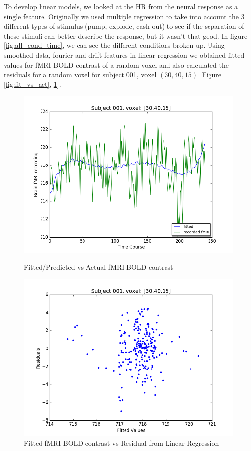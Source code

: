 \par To develop linear models, we looked at the HR from the neural response 
as a single feature. Originally we used multiple regression to take into 
account the 3 different types of stimulus (pump, explode, cash-out) to see if 
the separation of these stimuli can better describe the response, but it wasn't 
that good. In figure \ref{fig:all_cond_time}, we can see the different 
conditions broken up. Using smoothed data, fourier and drift features in linear 
regression we obtained fitted values for fMRI BOLD contrast of a random 
voxel and also calculated the residuals for a random voxel for subject 001, 
voxel $(30,40,15)$ [Figure \ref{fig:fit_vs_act}, \ref{fig:fit_vs_res}].

  
\begin{figure}[ht]
\centering
\begin{minipage}[b]{0.45\linewidth}
	\centering
	\includegraphics[width=.8\linewidth]{../images/Fitted_v_Actual.png} 
	\caption{Fitted/Predicted vs Actual fMRI BOLD contrast}
	\label{fig:fit_vs_act}
\end{minipage}	
\quad
\begin{minipage}[b]{0.45\linewidth}
	\centering
		\includegraphics[width=.8\linewidth]{../images/Fitted_v_Residuals.png} 
	\caption{Fitted fMRI BOLD contrast vs Residual from Linear Regression}
	\label{fig:fit_vs_res}
\end{minipage}
\end{figure}




